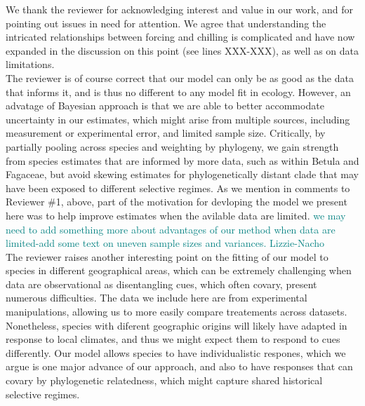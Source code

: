 \documentclass[11pt]{article}
\begin{document}
We thank the reviewer for acknowledging interest and value in our work, and for pointing out issues in need for attention. We agree that understanding the intricated relationships between forcing and chilling is complicated and have now expanded in the discussion on this point (see lines XXX-XXX), as well as on data limitations.\\ 
The reviewer is of course correct that our model can only be as good as the data that informs it, and is thus no different to any model fit in ecology. However, an advatage of Bayesian approach is that we are able to better accommodate uncertainty in our estimates, which might arise from multiple sources, including measurement or experimental error, and limited sample size. Critically, by partially pooling across species and weighting by phylogeny, we gain strength from species estimates that are informed by more data, such as within Betula and Fagaceae, but avoid skewing estimates for phylogenetically distant clade that may have been exposed to different selective regimes. As we mention in comments to Reviewer \#1, above, part of the motivation for devloping the model we present here was to help improve estimates when the avilable data are limited. \textcolor{teal}{we may need to add something more about advantages of our method when data are limited-add some text on uneven sample sizes and variances. Lizzie-Nacho}  %
\\
The reviewer raises another interesting point on the fitting of our model to species in different geographical areas, which can be extremely challenging when data are observational as disentangling cues, which often covary, present numerous difficulties. The data we include here are from experimental manipulations, allowing us to more easily compare treatements across datasets. Nonetheless, species with diferent geographic origins will likely have adapted in response to local climates, and thus we might expect them to respond to cues differently. Our model allows species to have individualistic respones, which we argue is one major advance of our approach, and also to have responses that can covary by phylogenetic relatedness, which might capture shared historical selective regimes.\\   
\end{document}
